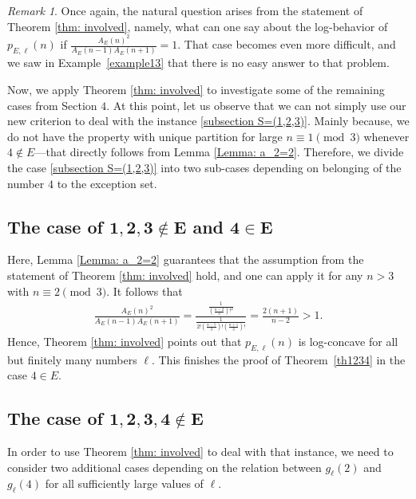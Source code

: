 \documentclass[12pt]{amsart}
\theoremstyle{definition}
\theoremstyle{remark}
\newtheorem*{remark}{Remark}
\numberwithin{theorem}{section} \numberwithin{equation}{section}
\begin{document}
\begin{remark}
Once again, the natural question arises from the statement of Theorem \ref{thm: involved}, namely, what can one say about the log-behavior of $p_{E,\ell }(n)$ if $\frac{A_E(n)^2}{A_E(n-1)A_E(n+1)}=1$. That case becomes even more difficult, and we saw
in Example~\ref{example13} that there is no
easy answer to that problem.
\end{remark}

Now, we apply Theorem \ref{thm: involved} to investigate some of the remaining cases from Section $4$. At this point, let us observe that we can not simply use our new criterion to deal with the instance \ref{subsection S=(1,2,3)}. Mainly because, we do not have the property with unique partition for large $n\equiv1\pmod{3}$ whenever $4\not\in E$---that directly follows from Lemma \ref{Lemma: a_2=2}. Therefore, we divide the case \ref{subsection S=(1,2,3)} into two sub-cases depending on belonging of the number $4$ to the exception set. 


\subsection{The case of $\mathbf{1,2,3 \not\in E}$ and $\mathbf{4\in E}$}\label{Paragraph: 1,2,3 not in E 4 in E}
Here, Lemma \ref{Lemma: a_2=2} guarantees that the assumption from the statement of Theorem \ref{thm: involved} hold, and one can apply it for any $n>3$ with $n\equiv2\pmod{3}$. It follows that
\begin{align*}
\frac{A_E(n)^2}{A_E(n-1)A_E(n+1)}=\frac{\frac{1}{\left(\frac{n-2}{3}\right)!^2}}{\frac{1}{2!\left(\frac{n-5}{3}\right)!\left(\frac{n+1}{3}\right)!}}=\frac{2(n+1)}{n-2}>1.
\end{align*}
Hence, Theorem \ref{thm: involved} points out that $p_{E,\ell }(n)$ is log-concave for all but finitely many numbers $\ell$.
This finishes the proof of
Theorem~\ref{th1234} in the case
$4\in E$.





\subsection{The case of $\mathbf{1,2,3,4 \not\in E}$} In order to use Theorem \ref{thm: involved} to deal with that instance, we need to consider two additional cases depending on the relation between $g_\ell(2)$ and $g_\ell(4)$ for all sufficiently large values of $\ell$.
\end{document}
